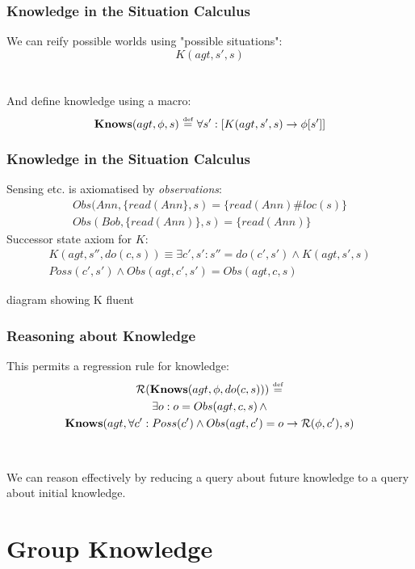 \documentclass[compress]{beamer}
\newcommand{\isdef}{\hbox{$\stackrel{\mbox{\tiny def}}{=}$}}
\newcommand{\Reg}{\mathcal{R}}
\newcommand{\Knows}{\mathbf{Knows}}
\begin{document}
\begin{frame}
\frametitle{Knowledge in the Situation Calculus}
We can reify possible worlds using "possible situations":
\begin{equation*}
 K(agt,s',s)
\end{equation*}
\ \\
\ \\
And define knowledge using a macro:
\begin{equation*}
\Knows(agt,\phi,s)\,\,\isdef\,\,\forall s': \left[ K(agt,s',s) \rightarrow \phi[s']\right]
\end{equation*}
\end{frame}

\begin{frame}
\frametitle{Knowledge in the Situation Calculus}
Sensing etc. is axiomatised by \emph{observations}:
\begin{gather*}
Obs(Ann,\{read(Ann\},s) = \{read(Ann)\#loc(s)\}\\
Obs(Bob,\{read(Ann)\},s) = \{read(Ann)\}
\end{gather*}
\pause
Successor state axiom for $K$:
\begin{multline*}
K(agt,s'',do(c,s)) \equiv \exists c',s': s'' = do(c',s') \wedge K(agt,s',s)\\
  Poss(c',s') \wedge Obs(agt,c',s') = Obs(agt,c,s)
\end{multline*}
\end{frame}

\begin{frame}
diagram showing K fluent
\end{frame}

\begin{frame}
\frametitle{Reasoning about Knowledge}
This permits a regression rule for knowledge:
\begin{multline*}
\Reg(\Knows(agt,\phi,do(c,s)))\,\,\isdef \\
  \exists o: o = Obs(agt,c,s)\,\wedge \\
  \Knows(agt,\forall c': Poss(c')\wedge Obs(agt,c')=o \rightarrow \Reg(\phi,c'),s)
\end{multline*}
\ \\
\ \\
We can reason effectively by reducing a query about future knowledge to a query about initial knowledge.
\end{frame}

\section{Group Knowledge}
\end{document}
